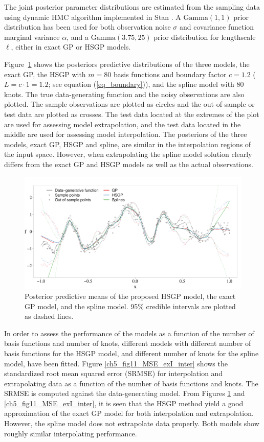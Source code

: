 \documentclass[onecolumn,a4paper,11pt]{article}
\begin{document}
The joint posterior parameter distributions are estimated from the sampling data using dynamic HMC algorithm implemented in Stan \citep{carpenter2017stan,betancourt2017conceptual}. A $\mathrm{Gamma}(1,1)$ prior distribution has been used for both observation noise $\sigma$ and covariance function marginal variance $\alpha$, and a $\mathrm{Gamma}(3.75,25)$ prior distribution for lengthscale $\ell$, either in exact GP or HSGP models.

Figure~\ref{ch5_fig10_Posteriors_exI} shows the posteriors predictive distributions of the three models, the exact GP, the HSGP with $m=80$ basis functions and boundary factor $c=1.2$ ($L=c\cdot 1= 1.2$; see equation (\ref{eq_boundary})), and the spline model with 80 knots. The true data-generating function and the noisy observations are also plotted. The sample observations are plotted as circles and the out-of-sample or test data are plotted as crosses. The test data located at the extremes of the plot are used for assessing model extrapolation, and the test data located in the middle are used for assessing model interpolation. The posteriors of the three models, exact GP, HSGP and spline, are similar in the interpolation regions of the input space. However, when extrapolating the spline model solution clearly differs from the exact GP and HSGP models as well as the actual observations. 

\begin{figure}
\centering
\includegraphics[width=\textwidth]{ch5_fig10_Posteriors_exI.pdf}
\caption{Posterior predictive means of the proposed HSGP model, the exact GP model, and the spline model. 95\% credible intervals are plotted as dashed lines.}
  \label{ch5_fig10_Posteriors_exI}
\end{figure}

In order to assess the performance of the models as a function of the number of basis functions and number of knots, different models with different number of basis functions for the HSGP model, and different number of knots for the spline model, have been fitted. Figure \ref{ch5_fig11_MSE_exI_inter} shows the standardized root mean squared error (SRMSE) for interpolation and extrapolating data as a function of the number of basis functions and knots. The SRMSE is computed against the data-generating model. From Figures \ref{ch5_fig10_Posteriors_exI} and \ref{ch5_fig11_MSE_exI_inter}, it is seen that the HSGP method yield a good approximation of the exact GP model for both interpolation and extrapolation. However, the spline model does not extrapolate data properly. Both models show roughly similar interpolating performance. 
\end{document}
